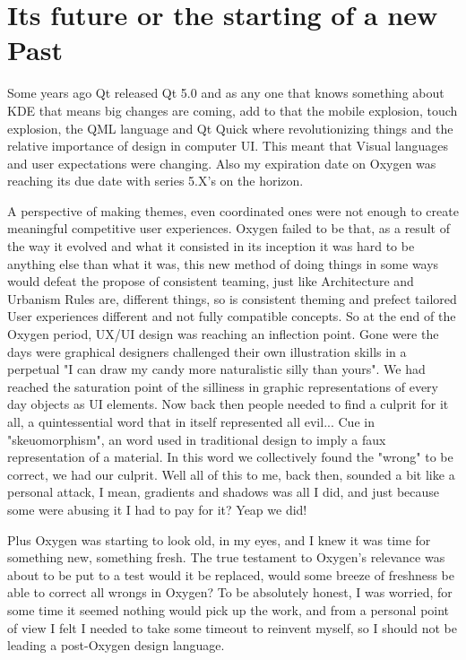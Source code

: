 {\section*{Its future or the starting of a new Past}
Some years ago Qt released Qt 5.0 and as any one that knows something about KDE that means big changes are coming, add to that the mobile explosion, touch explosion, the QML language and Qt Quick where revolutionizing things and the relative importance of design in computer UI. 
This meant that Visual languages and user expectations were changing. Also my expiration date on Oxygen was reaching its due date with series 5.X's on the horizon.

A perspective of making themes, even coordinated ones were not enough to create meaningful competitive user experiences.        
Oxygen failed to be that, as a result of the way it evolved and what it consisted in its inception it was hard to be anything else than what it was, this new method of doing things in some ways would defeat the propose of consistent teaming, just like Architecture and Urbanism Rules are, different things, so is consistent theming and prefect tailored User experiences different and not fully compatible concepts.    
So at the end of the Oxygen period, UX/UI design was reaching an inflection point. Gone were the days were graphical designers challenged their own illustration skills in a perpetual "I can draw my candy more naturalistic silly than yours".
We had reached the saturation point of the silliness in graphic representations of every day objects as UI elements. Now back then people needed to find a culprit for it all, a quintessential word that in itself represented all evil... Cue in "skeuomorphism", an word used in traditional design to imply a faux representation of a material. In this word we collectively found the "wrong" to be correct, we had our culprit.
Well all of this to me, back then, sounded a bit like a personal attack, I mean, gradients and shadows was all I did, and just because some were abusing it I had to pay for it? Yeap we did!

Plus Oxygen was starting to look old, in my eyes, and I knew it was time for something new, something fresh. 
The true testament to Oxygen's relevance was about to be put to a test would it be replaced, would some breeze of freshness be able to correct all wrongs in Oxygen?
To be absolutely honest, I was worried, for some time it seemed nothing would pick up the work, and from a personal point of view I felt I needed to take some timeout to reinvent myself, so I should not be leading a post-Oxygen design language.

}

